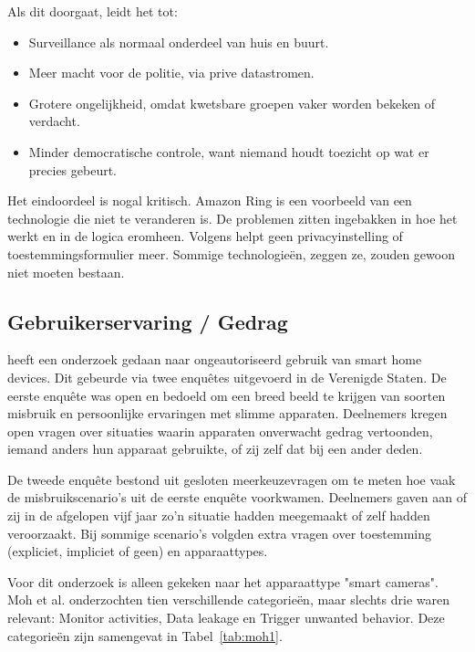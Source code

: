 \documentclass[nonacm, sigconf, balance=true]{acmart}
\begin{document}
    \noindent Als dit doorgaat, leidt het tot:
    \begin{itemize}
        \item Surveillance als normaal onderdeel van huis en buurt.
        \item Meer macht voor de politie, via prive datastromen.
        \item Grotere ongelijkheid, omdat kwetsbare groepen vaker worden bekeken of verdacht.
        \item Minder democratische controle, want niemand houdt toezicht op wat er precies gebeurt.
    \end{itemize}

    \noindent Het eindoordeel is nogal kritisch.
    Amazon Ring is een voorbeeld van een technologie die niet te veranderen is.
    De problemen zitten ingebakken in hoe het werkt en in de logica eromheen.
    Volgens \parencite{selinger2022amazon} helpt geen privacyinstelling of toestemmingsformulier meer.
    Sommige technologieën, zeggen ze, zouden gewoon niet moeten bestaan.

    \subsection{Gebruikerservaring / Gedrag}\label{subsec:gebruikerservaring-/-gedrag2}

    \parencite{moh2023characterizing} heeft een onderzoek gedaan naar ongeautoriseerd gebruik van smart home devices.
    Dit gebeurde via twee enquêtes uitgevoerd in de Verenigde Staten.
    De eerste enquête was open en bedoeld om een breed beeld te krijgen van soorten misbruik en persoonlijke ervaringen met slimme apparaten.
    Deelnemers kregen open vragen over situaties waarin apparaten onverwacht gedrag vertoonden, iemand anders hun apparaat gebruikte, of zij zelf dat bij een ander deden.

    De tweede enquête bestond uit gesloten meerkeuzevragen om te meten hoe vaak de misbruikscenario's uit de eerste enquête voorkwamen.
    Deelnemers gaven aan of zij in de afgelopen vijf jaar zo'n situatie hadden meegemaakt of zelf hadden veroorzaakt.
    Bij sommige scenario's volgden extra vragen over toestemming (expliciet, impliciet of geen) en apparaattypes.

    Voor dit onderzoek is alleen gekeken naar het apparaattype "smart cameras".
    Moh et al. onderzochten tien verschillende categorieën, maar slechts drie waren relevant: Monitor activities, Data leakage en Trigger unwanted behavior.
    Deze categorieën zijn samengevat in Tabel~\ref{tab:moh1}.
\end{document}
